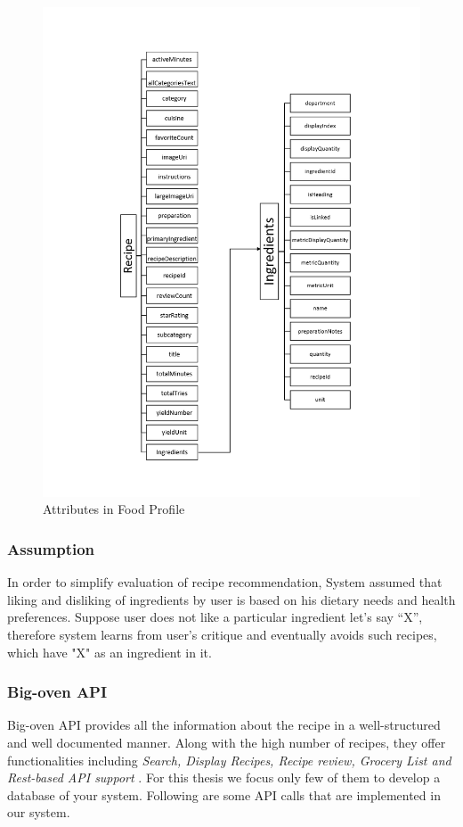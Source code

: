 \begin{figure}[h]
	\centering
	\includegraphics[width=.7\linewidth]{figures/ch2_food_profile.png}
	\caption{Attributes in Food Profile} 
	\label{fig:ch2_food_profile}
\end{figure}

\subsubsection{Assumption}

In order to simplify evaluation of recipe recommendation, System assumed that liking and disliking of ingredients by user is based on his dietary needs and health preferences. Suppose user does not like a particular ingredient let’s say “X”, therefore system learns from user’s critique and eventually avoids such recipes, which have "X" as an ingredient in it.

\subsubsection{Big-oven API}

Big-oven API provides all the information about the recipe in a well-structured and well documented manner. Along with the high number of recipes, they offer functionalities including  \textit{Search, Display Recipes, Recipe review, Grocery List and Rest-based API support} . For this thesis we focus only few of them to develop a database of your system.  Following are some API calls that are implemented in our system.



